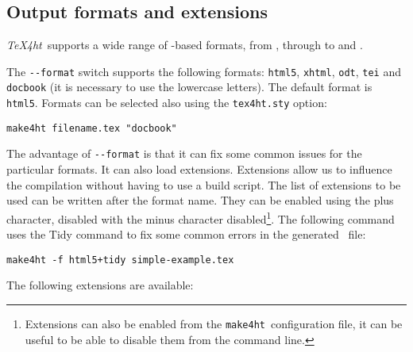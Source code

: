 \documentclass{ltugproc}
\newcommand\term[1]{\textit{#1}}
\newcommand\command[1]{\texttt{#1}}
\newcommand\packagename[1]{\texttt{#1\-.sty}}
\newcommand\texfourht{\term{\TeX\-4ht}}
\newcommand\makefourht{\command{make4ht}}
\newcommand\switch[1]{\texttt{-\/-#1}}
\begin{document}
\subsection{Output formats and extensions}

\texfourht\ supports a wide range of \XML-based formats, from , through  to
 and . 

The \switch{format} switch supports the following formats: \command{html5}, \command{xhtml}, \command{odt}, \command{tei} and \command{docbook} (it is necessary to use the lowercase letters). 
The default format is \command{html5}. Formats can be selected also using the \packagename{tex4ht} option:

\begin{verbatim}
make4ht filename.tex "docbook"
\end{verbatim}

The advantage of \switch{format} is that it can fix some common issues for the particular formats. 
It can also load extensions. Extensions allow us to influence the compilation
without having to use a build script. The list of extensions to be used can be
written after the format name. They can be  enabled using the plus character,
disabled with the minus character disabled\footnote{Extensions can also be
enabled from the \makefourht\ configuration file, it can be useful to be able
to disable them from  the command line.}. The following command uses the \HTML
Tidy command to fix some common errors in the generated \HTML\ file:


\begin{verbatim}
make4ht -f html5+tidy simple-example.tex
\end{verbatim}

The following extensions are available:

 
\end{document}
